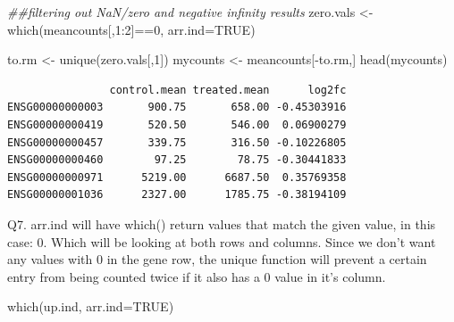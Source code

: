 \documentclass[
  letterpaper,
  DIV=11,
  numbers=noendperiod]{scrartcl}
\newenvironment{Shaded}{\begin{snugshade}}{\end{snugshade}}
\newcommand{\AttributeTok}[1]{\textcolor[rgb]{0.40,0.45,0.13}{#1}}
\newcommand{\ConstantTok}[1]{\textcolor[rgb]{0.56,0.35,0.01}{#1}}
\newcommand{\DecValTok}[1]{\textcolor[rgb]{0.68,0.00,0.00}{#1}}
\newcommand{\DocumentationTok}[1]{\textcolor[rgb]{0.37,0.37,0.37}{\textit{#1}}}
\newcommand{\FunctionTok}[1]{\textcolor[rgb]{0.28,0.35,0.67}{#1}}
\newcommand{\NormalTok}[1]{\textcolor[rgb]{0.00,0.23,0.31}{#1}}
\newcommand{\OtherTok}[1]{\textcolor[rgb]{0.00,0.23,0.31}{#1}}
\newcommand{\SpecialCharTok}[1]{\textcolor[rgb]{0.37,0.37,0.37}{#1}}
\begin{document}
\begin{Shaded}
\begin{Highlighting}[]
\DocumentationTok{\#\#filtering out NaN/zero and negative infinity results}
\NormalTok{zero.vals }\OtherTok{\textless{}{-}} \FunctionTok{which}\NormalTok{(meancounts[,}\DecValTok{1}\SpecialCharTok{:}\DecValTok{2}\NormalTok{]}\SpecialCharTok{==}\DecValTok{0}\NormalTok{, }\AttributeTok{arr.ind=}\ConstantTok{TRUE}\NormalTok{)}

\NormalTok{to.rm }\OtherTok{\textless{}{-}} \FunctionTok{unique}\NormalTok{(zero.vals[,}\DecValTok{1}\NormalTok{])}
\NormalTok{mycounts }\OtherTok{\textless{}{-}}\NormalTok{ meancounts[}\SpecialCharTok{{-}}\NormalTok{to.rm,]}
\FunctionTok{head}\NormalTok{(mycounts)}
\end{Highlighting}
\end{Shaded}

\begin{verbatim}
                control.mean treated.mean      log2fc
ENSG00000000003       900.75       658.00 -0.45303916
ENSG00000000419       520.50       546.00  0.06900279
ENSG00000000457       339.75       316.50 -0.10226805
ENSG00000000460        97.25        78.75 -0.30441833
ENSG00000000971      5219.00      6687.50  0.35769358
ENSG00000001036      2327.00      1785.75 -0.38194109
\end{verbatim}

Q7. arr.ind will have which() return values that match the given value,
in this case: 0. Which will be looking at both rows and columns. Since
we don't want any values with 0 in the gene row, the unique function
will prevent a certain entry from being counted twice if it also has a 0
value in it's column.

\begin{Shaded}
\end{Shaded}

\begin{Shaded}
\begin{Highlighting}[]
\FunctionTok{which}\NormalTok{(up.ind, }\AttributeTok{arr.ind=}\ConstantTok{TRUE}\NormalTok{)}
\end{Highlighting}
\end{Shaded}
\end{document}
